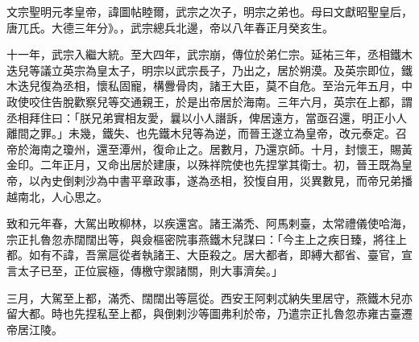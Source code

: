 
\begin{pinyinscope}

 文宗聖明元孝皇帝，諱圖帖睦爾，武宗之次子，明宗之弟也。母曰文獻昭聖皇后，唐兀氏。大德三年分》。，武宗總兵北邊，帝以八年春正月癸亥生。



 十一年，武宗入繼大統。至大四年，武宗崩，傳位於弟仁宗。延祐三年，丞相鐵木迭兒等議立英宗為皇太子，明宗以武宗長子，乃出之，居於朔漠。及英宗即位，鐵木迭兒復為丞相，懷私固寵，構釁骨肉，諸王大臣，莫不自危。至治元年五月，中政使咬住告脫歡察兒等交通親王，於是出帝居於海南。三年六月，英宗在上都，謂丞相拜住曰：「朕兄弟實相友愛，曩以小人譖訴，俾居遠方，當亟召還，明正小人離間之罪。」未幾，鐵失、也先鐵木兒等為逆，而晉王遂立為皇帝，改元泰定。召帝於海南之瓊州，還至潭州，復命止之。居數月，乃還京師。十月，封懷王，賜黃金印。二年正月，又命出居於建康，以殊祥院使也先捏掌其衛士。初，晉王既為皇帝，以內史倒剌沙為中書平章政事，遂為丞相，狡愎自用，災異數見，而帝兄弟播越南北，人心思之。



 致和元年春，大駕出畋柳林，以疾還宮。諸王滿禿、阿馬剌臺，太常禮儀使哈海，宗正扎魯忽赤闊闊出等，與僉樞密院事燕鐵木兒謀曰：「今主上之疾日臻，將往上都。如有不諱，吾黨扈從者執諸王、大臣殺之。居大都者，即縛大都省、臺官，宣言太子已至，正位宸極，傳檄守禦諸關，則大事濟矣。」



 三月，大駕至上都，滿禿、闊闊出等扈從。西安王阿剌忒納失里居守，燕鐵木兒亦留大都。時也先捏私至上都，與倒剌沙等圖弗利於帝，乃遣宗正扎魯忽赤雍古臺遷帝居江陵。




\end{pinyinscope}
